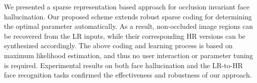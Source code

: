 {
We presented a sparse representation based approach for occlusion invariant face hallucination. Our proposed scheme extends robust sparse coding for determining the optimal parameter automatically. As a result, non-occluded image regions can be recovered from the LR inputs, while their corresponding HR versions can be synthesized accordingly. The above coding and learning process is based on maximum likelihood estimation, and thus no user interaction or parameter tuning is required. Experimental results on both face hallucination and the LR-to-HR face recognition tasks confirmed the effectiveness and robustness of our approach.


}
